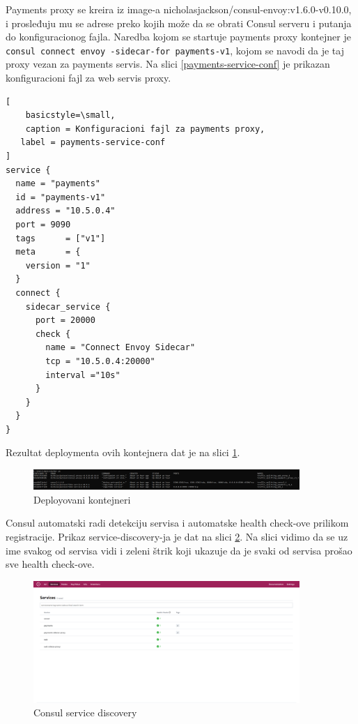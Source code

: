 \documentclass[a4paper,12pt]{report}
\begin{document}
Payments proxy se kreira iz image-a nicholasjackson/consul-envoy:v1.6.0-v0.10.0, i prosleđuju mu se adrese preko kojih može da se obrati Consul serveru i putanja do konfiguracionog fajla. Naredba kojom se startuje payments proxy kontejner je \texttt{consul connect envoy -sidecar-for payments-v1}, kojom se navodi da je taj proxy vezan za payments servis. Na slici \ref{payments-service-conf} je prikazan konfiguracioni fajl za web servis proxy. \newline


\begin{lstlisting}[
    basicstyle=\small,
    caption = Konfiguracioni fajl za payments proxy, 
   label = payments-service-conf
]
service {
  name = "payments"
  id = "payments-v1"
  address = "10.5.0.4"
  port = 9090
  tags      = ["v1"]
  meta      = {
    version = "1"
  }
  connect { 
    sidecar_service {
      port = 20000
      check {
        name = "Connect Envoy Sidecar"
        tcp = "10.5.0.4:20000"
        interval ="10s"
      }
    }  
  }
}

\end{lstlisting}

Rezultat deploymenta ovih kontejnera dat je na slici \ref{fig:consul-services-deployment}.\newline

\begin{figure}[h]
    \centering
    \includegraphics[width=0.9\textwidth]{consul_services_deployment}
    \caption{Deployovani kontejneri}
    \label{fig:consul-services-deployment}
\end{figure} 

Consul automatski radi detekciju servisa i automatske health check-ove prilikom registracije. Prikaz service-discovery-ja je dat na slici \ref{fig:consul-service-discovery}. Na slici vidimo da se uz ime svakog od servisa vidi i zeleni štrik koji ukazuje da je svaki od servisa prošao sve health check-ove. \newline

\begin{figure}[h]
    \centering
    \includegraphics[width=0.9\textwidth]{consul_service_discovery}
    \caption{Consul service discovery}
    \label{fig:consul-service-discovery}
\end{figure} 
\end{document}
